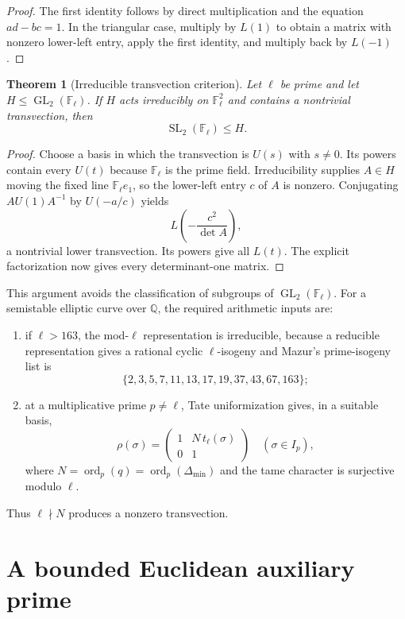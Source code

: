 \documentclass[11pt]{article}
\newtheorem{theorem}{Theorem}[section]
\newcommand{\Q}{\mathbb Q}
\newcommand{\F}{\mathbb F}
\newcommand{\SL}{\operatorname{SL}}
\newcommand{\GL}{\operatorname{GL}}
\newcommand{\ord}{\operatorname{ord}}
\begin{document}
\begin{proof}
The first identity follows by direct multiplication and the equation
$ad-bc=1$.  In the triangular case, multiply by $L(1)$ to obtain a matrix with
nonzero lower-left entry, apply the first identity, and multiply back by
$L(-1)$.
\end{proof}

\begin{theorem}[Irreducible transvection criterion]
Let $\ell$ be prime and let $H\le\GL_2(\F_\ell)$.  If $H$ acts irreducibly on
$\F_\ell^2$ and contains a nontrivial transvection, then
\[
 \SL_2(\F_\ell)\le H.
\]
\end{theorem}

\begin{proof}
Choose a basis in which the transvection is $U(s)$ with $s\ne0$.  Its powers
contain every $U(t)$ because $\F_\ell$ is the prime field.  Irreducibility
supplies $A\in H$ moving the fixed line $\F_\ell e_1$, so the lower-left entry
$c$ of $A$ is nonzero.  Conjugating $A U(1)A^{-1}$ by
$U(-a/c)$ yields
\[
 L\!\left(-\frac{c^2}{\det A}\right),
\]
a nontrivial lower transvection.  Its powers give all $L(t)$.  The explicit
factorization now gives every determinant-one matrix.
\end{proof}

This argument avoids the classification of subgroups of $\GL_2(\F_\ell)$.
For a semistable elliptic curve over $\Q$, the required arithmetic inputs are:

\begin{enumerate}[label=(\arabic*)]
\item if $\ell>163$, the mod-$\ell$ representation is irreducible, because a
reducible representation gives a rational cyclic $\ell$-isogeny and Mazur's
prime-isogeny list is
\[
 \{2,3,5,7,11,13,17,19,37,43,67,163\};
\]
\item at a multiplicative prime $p\ne\ell$, Tate uniformization gives, in a
suitable basis,
\[
 \rho(\sigma)=
 \begin{pmatrix}1&N\,t_\ell(\sigma)\\0&1\end{pmatrix}
 \quad(\sigma\in I_p),
\]
where $N=\ord_p(q)=\ord_p(\Delta_{\min})$ and the tame character is
surjective modulo $\ell$.
\end{enumerate}
Thus $\ell\nmid N$ produces a nonzero transvection.

\section{A bounded Euclidean auxiliary prime}
\end{document}
